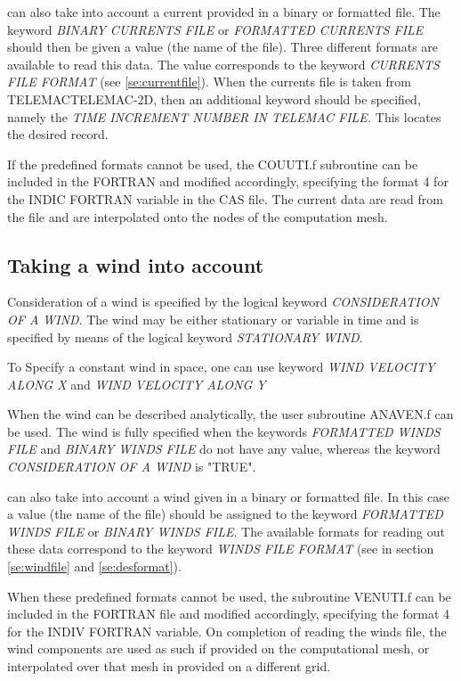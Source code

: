  \tomawac can also take into account a current provided in a binary or formatted file. The keyword \textit{BINARY CURRENTS FILE }or\textit{ FORMATTED CURRENTS FILE} should then be given a value (the name of the file). Three different formats are available to read this data. The value corresponds to the keyword \textit{CURRENTS FILE FORMAT} (see \ref{se:currentfile}). When the currents file is taken from TELEMACTELEMAC-2D, then an additional keyword should be specified, namely the \textit{TIME INCREMENT NUMBER IN TELEMAC FILE.} This locates the desired record.

 If the predefined formats cannot be used, the COUUTI.f subroutine can be included in the FORTRAN and modified accordingly, specifying the format 4 for the INDIC FORTRAN variable in the CAS file. The current data are read from the file and are interpolated onto the nodes of the computation mesh.


\subsection{ Taking a wind into account}
\label{se:wind}
Consideration of a wind is specified by the logical keyword \textit{CONSIDERATION OF A WIND}. The wind may be either stationary or variable in time and is specified by means of the logical keyword \textit{STATIONARY WIND}.

To Specify a constant wind in space, one can use keyword \textit{WIND VELOCITY ALONG X} and \textit{WIND VELOCITY ALONG Y}

 When the wind can be described analytically, the user subroutine ANAVEN.f can be used. The wind is fully specified when the keywords \textit{FORMATTED WINDS FILE} and \textit{BINARY WINDS FILE} do not have any value, whereas the keyword \textit{CONSIDERATION OF A WIND }is "TRUE".

 \tomawac can also take into account a wind given in a binary or formatted file. In this case a value (the name of the file) should be assigned to the keyword \textit{FORMATTED WINDS FILE }or \textit{BINARY WINDS FILE}. The available formats for reading out these data correspond to the keyword \textit{WINDS FILE FORMAT} (see in section \ref{se:windfile} and \ref{se:desformat}).

 When these predefined formats cannot be used, the subroutine VENUTI.f can be included in the FORTRAN file and modified accordingly, specifying the format 4 for the INDIV FORTRAN variable. On completion of reading the winds file, the wind components are used as such if provided on the computational mesh, or interpolated over that mesh in provided on a different grid.

